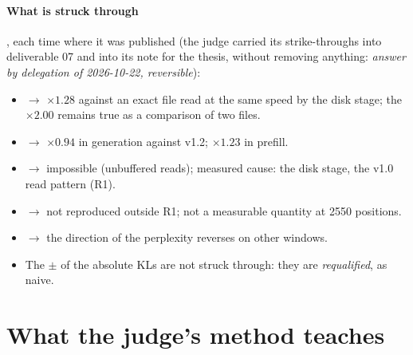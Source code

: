 \paragraph{What is struck through}, each time where it was published (the judge carried its strike-throughs into deliverable 07 and into its note for the thesis, without removing anything: \emph{answer by delegation of 2026-10-22, reversible}):
\begin{itemize}
\item {} $\to$ $\times 1.28$ against an exact file read at the same speed by the disk stage; the $\times 2.00$ remains true as a comparison of two files.
\item {} $\to$ $\times 0.94$ in generation against v1.2; $\times 1.23$ in prefill.
\item {} $\to$ impossible (unbuffered reads); measured cause: the disk stage,  the v1.0 read pattern (R1).
\item {} $\to$ not reproduced outside R1; not a measurable quantity at \num{2550} positions.
\item {} $\to$ the direction of the perplexity reverses on other windows.
\item The $\pm$ of the absolute KLs are not struck through: they are \emph{requalified}, as naive.
\end{itemize}

\section{What the judge's method teaches}\label{t3jug:sec:recettes}

